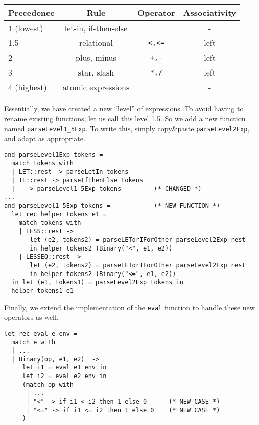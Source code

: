 \documentclass[addpoints]{exam}
\begin{document}
\begin{questions}
\begin{solution}
    \begin{center}
      \begin{tabular}{|l|c|c|c|}
        \hline
        Precedence & Rule & Operator & Associativity \\\hline\hline
        1 (lowest)  & let-in, if-then-else &  & - \\\hline
        1.5           & relational & \texttt{<,<=} & left\\\hline
        2           & plus, minus & \texttt{+,-} & left\\\hline
        3           & star, slash & \texttt{*,/} & left\\\hline
        4 (highest) & atomic expressions &              & -\\\hline
      \end{tabular}
    \end{center}

    Essentially, we have created a new ``level'' of expressions.
    To avoid having to rename existing functions, let us call this level 1.5.
    So we add a new function named \texttt{parseLevel1\_5Exp}.
    To write this, simply copy\&paste \texttt{parseLevel2Exp},
    and adapt as appropriate.
    
    {\small
    \begin{verbatim}      
and parseLevel1Exp tokens =
  match tokens with
  | LET::rest -> parseLetIn tokens
  | IF::rest -> parseIfThenElse tokens
  | _ -> parseLevel1_5Exp tokens         (* CHANGED *)
...
and parseLevel1_5Exp tokens =            (* NEW FUNCTION *)
  let rec helper tokens e1 =
    match tokens with
    | LESS::rest ->
       let (e2, tokens2) = parseLETorIForOther parseLevel2Exp rest
       in helper tokens2 (Binary("<", e1, e2))
    | LESSEQ::rest ->
       let (e2, tokens2) = parseLETorIForOther parseLevel2Exp rest
       in helper tokens2 (Binary("<=", e1, e2))
  in let (e1, tokens1) = parseLevel2Exp tokens in
  helper tokens1 e1
    \end{verbatim}
    }

    Finally, we extend the implementation of the \texttt{eval}
    function to handle these new operators as well.

    {\small
    \begin{verbatim}      
let rec eval e env =
  match e with
  | ...
  | Binary(op, e1, e2)  ->
     let i1 = eval e1 env in
     let i2 = eval e2 env in
     (match op with
      | ...
      | "<" -> if i1 < i2 then 1 else 0      (* NEW CASE *)
      | "<=" -> if i1 <= i2 then 1 else 0    (* NEW CASE *)
     )
    \end{verbatim}
    }
  \end{solution}


\end{questions}
\end{document}
